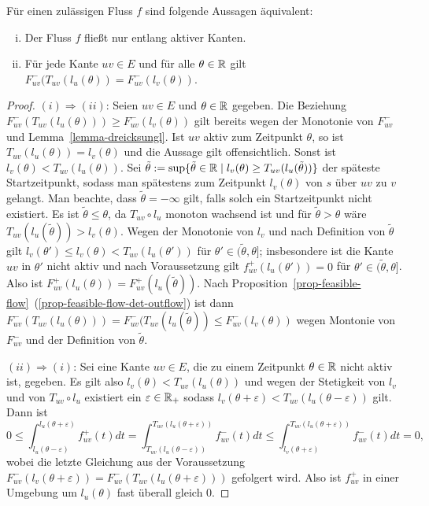 \begin{lemma}
	Für einen zulässigen Fluss $f$ sind folgende Aussagen äquivalent:
	\begin{enumerate}[(i)]
		\item Der Fluss $f$ fließt nur entlang aktiver Kanten.
		\item Für jede Kante $uv\in E$ und für alle $\theta\in\mathbb{R}$ gilt $F_{uv}^-(T_{uv}(l_u(\theta)) = F_{uv}^-(l_v(\theta))$.
	\end{enumerate}
\end{lemma}
\begin{proof}
	$(i)\Rightarrow (ii)$: Seien $uv\in E$ und $\theta\in\mathbb{R}$ gegeben.
	Die Beziehung $F_{uv}^-(T_{uv}(l_u(\theta))) \geq F_{uv}^-(l_v(\theta))$ gilt bereits wegen der Monotonie von $F_{uv}^-$ und Lemma~\ref{lemma-dreicksungl}.
	Ist $uv$ aktiv zum Zeitpunkt $\theta$, so ist $T_{uv}(l_u(\theta))=l_v(\theta)$ und die Aussage gilt offensichtlich.
	Sonst ist $l_v(\theta) < T_{uv}(l_u(\theta))$. 
	Sei $\tilde{\theta}:=\sup\{ \tilde{\theta}\in\mathbb{R} \mid l_v(\theta) \geq T_{uv}(l_u(\tilde{\theta})) \}$ der späteste Startzeitpunkt, sodass man spätestens zum Zeitpunkt $l_v(\theta)$ von $s$ über $uv$ zu $v$ gelangt.
	Man beachte, dass $\tilde{\theta}=-\infty$ gilt, falls solch ein Startzeitpunkt nicht existiert.
	Es ist $\tilde{\theta} \leq \theta$, da $T_{uv}\circ l_u$ monoton wachsend ist und für $\tilde{\theta} > \theta$ wäre $T_{uv}(l_u(\tilde{\theta})) > l_v(\theta)$.
	Wegen der Monotonie von $l_v$ und nach Definition von $\tilde{\theta}$ gilt $l_v(\theta')\leq l_v(\theta)< T_{uv}(l_u(\theta'))$ für $\theta'\in (\tilde{\theta}, \theta]$; insbesondere ist die Kante $uv$ in $\theta'$ nicht aktiv und nach Voraussetzung gilt $f_{uv}^+(l_u(\theta')) = 0$ für $\theta'\in (\tilde{\theta}, \theta]$. 
	Also ist $F_{uv}^+(l_u(\theta)) = F_{uv}^+(l_u(\tilde{\theta}))$. Nach Proposition~\ref{prop-feasible-flow}~(\ref{prop-feasible-flow-det-outflow}) ist dann $F_{uv}^-(T_{uv}(l_u(\theta))) = F_{uv}^-(T_{uv}(l_u(\tilde{\theta}))\leq F_{uv}^-(l_v(\theta))$ wegen Montonie von $F_{uv}^-$ und der Definition von $\tilde{\theta}$.
	
	$(ii) \Rightarrow (i)$: Sei eine Kante $uv\in E$, die zu einem Zeitpunkt $\theta\in\mathbb{R}$ nicht aktiv ist, gegeben.
	Es gilt also $l_v(\theta) < T_{uv}(l_u(\theta))$ und wegen der Stetigkeit von $l_v$ und von $T_{uv}\circ l_u$ existiert ein $\varepsilon\in\mathbb{R}_+$ sodass $l_v(\theta + \varepsilon) < T_{uv}(l_u(\theta - \varepsilon))$ gilt.
	Dann ist 
	$$
	0
	\leq
	\int_{l_u(\theta-\varepsilon)}^{l_u(\theta + \varepsilon)}f_{uv}^+(t) dt
	=
	\int_{T_{uv}(l_u(\theta-\varepsilon))}^{T_{uv}(l_u(\theta+\varepsilon))} f_{uv}^-(t) dt
	\leq
	\int_{l_v(\theta + \varepsilon)}^{T_{uv}(l_u(\theta + \varepsilon))} f_{uv}^-(t) dt
	=
	0,
	$$
	wobei die letzte Gleichung aus der Voraussetzung $F_{uv}^-(l_v(\theta+\varepsilon)) = F_{uv}^-(T_{uv}(l_u(\theta + \varepsilon)))$ gefolgert wird.
	Also ist $f_{uv}^+$ in einer Umgebung um $l_u(\theta)$ fast überall gleich $0$.
	

\end{proof}
